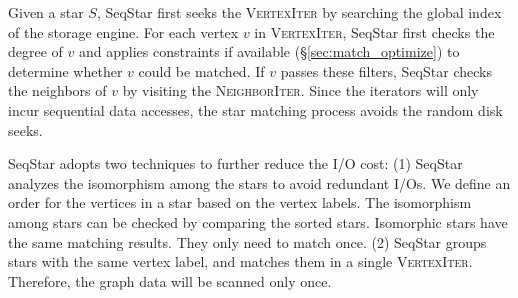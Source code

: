 Given a star $S$, SeqStar first seeks the \textsc{VertexIter} by searching the global index of the storage engine.
For each vertex $v$ in \textsc{VertexIter},
SeqStar first checks the degree of $v$ and applies constraints if available (\S\ref{sec:match_optimize}) to determine whether $v$ could be matched.
If $v$ passes these filters, SeqStar checks the neighbors of $v$ by visiting the \textsc{NeighborIter}.
Since the iterators will only incur sequential data accesses,
the star matching process avoids the random disk seeks.

SeqStar adopts two techniques to further reduce the I/O cost:
(1) SeqStar analyzes the isomorphism among the stars to avoid redundant I/Os.
We define an order for the vertices in a star based on the vertex labels. The isomorphism among stars can be checked by comparing the sorted stars.
Isomorphic stars have the same matching results. They only need to match once.
(2) SeqStar groups stars with the same vertex label,
and matches them in a single \textsc{VertexIter}.
Therefore, the graph data will be scanned only once.

